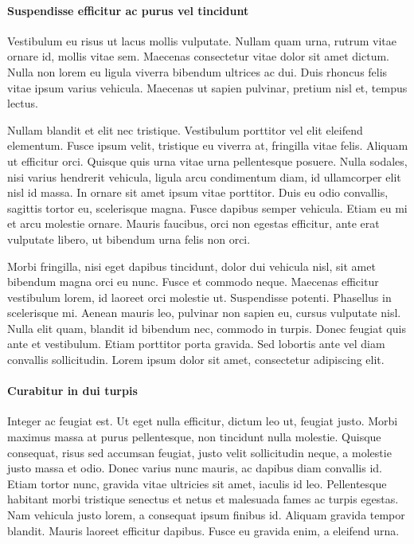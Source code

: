 \paragraph{Suspendisse efficitur ac purus vel tincidunt} Vestibulum eu risus ut lacus mollis vulputate. Nullam quam urna, rutrum vitae ornare id, mollis vitae sem. Maecenas consectetur vitae dolor sit amet dictum. Nulla non lorem eu ligula viverra bibendum ultrices ac dui. Duis rhoncus felis vitae ipsum varius vehicula. Maecenas ut sapien pulvinar, pretium nisl et, tempus lectus.

Nullam blandit et elit nec tristique. Vestibulum porttitor vel elit eleifend elementum. Fusce ipsum velit, tristique eu viverra at, fringilla vitae felis. Aliquam ut efficitur orci. Quisque quis urna vitae urna pellentesque posuere. Nulla sodales, nisi varius hendrerit vehicula, ligula arcu condimentum diam, id ullamcorper elit nisl id massa. In ornare sit amet ipsum vitae porttitor. Duis eu odio convallis, sagittis tortor eu, scelerisque magna. Fusce dapibus semper vehicula. Etiam eu mi et arcu molestie ornare. Mauris faucibus, orci non egestas efficitur, ante erat vulputate libero, ut bibendum urna felis non orci.

Morbi fringilla, nisi eget dapibus tincidunt, dolor dui vehicula nisl, sit amet bibendum magna orci eu nunc. Fusce et commodo neque. Maecenas efficitur vestibulum lorem, id laoreet orci molestie ut. Suspendisse potenti. Phasellus in scelerisque mi. Aenean mauris leo, pulvinar non sapien eu, cursus vulputate nisl. Nulla elit quam, blandit id bibendum nec, commodo in turpis. Donec feugiat quis ante et vestibulum. Etiam porttitor porta gravida. Sed lobortis ante vel diam convallis sollicitudin. Lorem ipsum dolor sit amet, consectetur adipiscing elit.

\paragraph{Curabitur in dui turpis} Integer ac feugiat est. Ut eget nulla efficitur, dictum leo ut, feugiat justo. Morbi maximus massa at purus pellentesque, non tincidunt nulla molestie. Quisque consequat, risus sed accumsan feugiat, justo velit sollicitudin neque, a molestie justo massa et odio. Donec varius nunc mauris, ac dapibus diam convallis id. Etiam tortor nunc, gravida vitae ultricies sit amet, iaculis id leo. Pellentesque habitant morbi tristique senectus et netus et malesuada fames ac turpis egestas. Nam vehicula justo lorem, a consequat ipsum finibus id. Aliquam gravida tempor blandit. Mauris laoreet efficitur dapibus. Fusce eu gravida enim, a eleifend urna.

